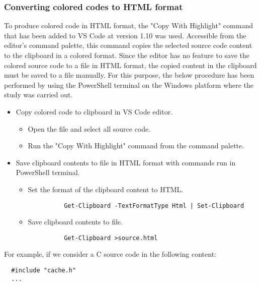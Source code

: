 \documentclass{article}
\begin{document}
\subsubsection{Converting colored codes to HTML format}

To produce colored code in HTML format, the "Copy With Highlight" command that has been added to VS Code at version 1.10 was used. Accessible from the editor's command palette, this command copies the selected source code content to the clipboard in a colored format. Since the editor has no feature to save the colored source code to a file in HTML format, the copied content in the clipboard must be saved to a file manually. For this purpose, the below procedure has been performed by using the PowerShell terminal on the Windows platform where the study was carried out.

\begin{itemize}
  \item Copy colored code to clipboard in VS Code editor.
    \begin{itemize}
      \item Open the file and select all source code.
      \item Run the "Copy With Highlight" command from the command palette.
    \end{itemize}
  \item Save clipboard contents to file in HTML format with commands run in PowerShell terminal.
    \begin{itemize}
      \item Set the format of the clipboard content to HTML.
        \begin{verbatim}
          Get-Clipboard -TextFormatType Html | Set-Clipboard
        \end{verbatim}
      \item Save clipboard contents to file.
        \begin{verbatim}
          Get-Clipboard >source.html
        \end{verbatim}
    \end{itemize}
\end{itemize}

For example, if we consider a C source code in the following content:

\vspace{0.1in}
\begin{BVerbatim}
  #include "cache.h"
  ...
\end{BVerbatim}
\vspace{0.1in}
\end{document}
